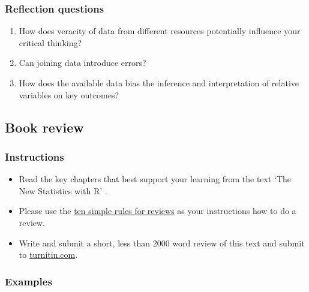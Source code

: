 \documentclass[
]{book}
\providecommand{\tightlist}{%
  \setlength{\itemsep}{0pt}\setlength{\parskip}{0pt}}
\begin{document}
\hypertarget{reflection-questions-4}{%
\subsubsection*{Reflection questions}\label{reflection-questions-4}}

\begin{enumerate}
\def\labelenumi{\arabic{enumi}.}
\tightlist
\item
  How does veracity of data from different resources potentially influence your critical thinking?\\
\item
  Can joining data introduce errors?
\item
  How does the available data bias the inference and interpretation of relative variables on key outcomes?
\end{enumerate}

\hypertarget{book-review}{%
\subsection*{Book review}\label{book-review}}

\hypertarget{instructions-1}{%
\subsubsection*{Instructions}\label{instructions-1}}

\begin{itemize}
\tightlist
\item
  Read the key chapters that best support your learning from the text `The New Statistics with R' \citep{RN6087}.\\
\item
  Please use the \href{https://journals.plos.org/ploscompbiol/article?id=10.1371/journal.pcbi.1006562}{ten simple rules for reviews} \citep{RN6148} as your instructions how to do a review.\\
\item
  Write and submit a short, less than 2000 word review of this text and submit to \href{https://www.turnitin.com}{turnitin.com}.
\end{itemize}

\hypertarget{examples}{%
\subsubsection*{Examples}\label{examples}}
\end{document}
